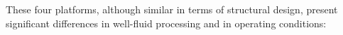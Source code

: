 


These four platforms, although similar in terms of structural design, present significant differences in well-fluid processing and in operating conditions: 

